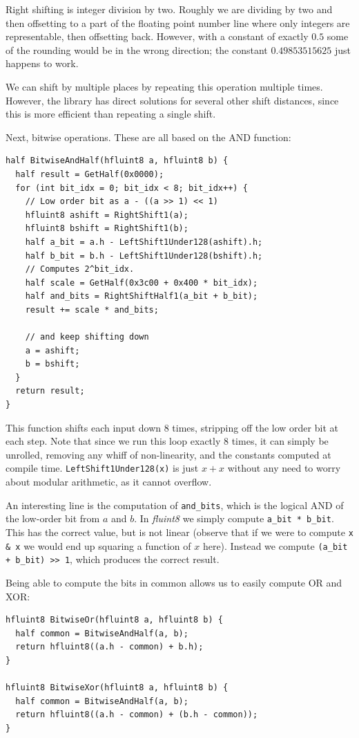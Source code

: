\documentclass[twocolumn]{article}
\begin{document}
Right shifting is integer division by two. Roughly we are dividing by
two and then offsetting to a part of the floating point number line
where only integers are representable, then offsetting back. However,
with a constant of exactly $0.5$ some of the rounding would be in the
wrong direction; the constant $0.49853515625$ just happens to work.

We can shift by multiple places by repeating this operation multiple
times.
However, the library has direct solutions for several other shift
distances, since this is more efficient than repeating a single shift.

Next, bitwise operations. These are all based on the AND function:

\begin{lstlisting}
half BitwiseAndHalf(hfluint8 a, hfluint8 b) {
  half result = GetHalf(0x0000);
  for (int bit_idx = 0; bit_idx < 8; bit_idx++) {
    // Low order bit as a - ((a >> 1) << 1)
    hfluint8 ashift = RightShift1(a);
    hfluint8 bshift = RightShift1(b);
    half a_bit = a.h - LeftShift1Under128(ashift).h;
    half b_bit = b.h - LeftShift1Under128(bshift).h;
    // Computes 2^bit_idx.
    half scale = GetHalf(0x3c00 + 0x400 * bit_idx);
    half and_bits = RightShiftHalf1(a_bit + b_bit);
    result += scale * and_bits;

    // and keep shifting down
    a = ashift;
    b = bshift;
  }
  return result;
}
\end{lstlisting}

This function shifts each input down 8 times, stripping off
the low order bit at each step. Note that since we run this
loop exactly 8 times, it can simply be unrolled, removing
any whiff of non-linearity, and the constants computed at
compile time. \verb+LeftShift1Under128(x)+ is just $x + x$
without any need to worry about modular arithmetic, as it
cannot overflow.

An interesting line is the computation of \verb+and_bits+,
which is the logical AND of the low-order bit from $a$ and $b$.
In {\it fluint8} we simply compute \verb+a_bit * b_bit+. This
has the correct value, but is not linear (observe that if
we were to compute \verb+x & x+ we would end up squaring a
function of $x$ here). Instead we compute \verb|(a_bit + b_bit) >> 1|,
which produces the correct result.

Being able to compute the bits in common allows us to easily compute
OR and XOR:

\begin{lstlisting}
hfluint8 BitwiseOr(hfluint8 a, hfluint8 b) {
  half common = BitwiseAndHalf(a, b);
  return hfluint8((a.h - common) + b.h);
}

hfluint8 BitwiseXor(hfluint8 a, hfluint8 b) {
  half common = BitwiseAndHalf(a, b);
  return hfluint8((a.h - common) + (b.h - common));
}
\end{lstlisting}
\end{document}
